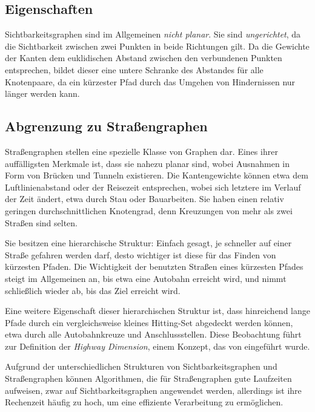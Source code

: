 \subsection{Eigenschaften}

Sichtbarkeitsgraphen sind im Allgemeinen \emph{nicht planar}.
Sie sind \emph{ungerichtet}, da die Sichtbarkeit zwischen zwei Punkten in beide Richtungen gilt.
Da die Gewichte der Kanten dem euklidischen Abstand zwischen den verbundenen Punkten entsprechen, bildet dieser eine untere Schranke des Abstandes für alle Knotenpaare, da ein kürzester Pfad durch das Umgehen von Hindernissen nur länger werden kann.

\subsection{Abgrenzung zu Straßengraphen}\label{graphs:strassengraphen}

Straßengraphen stellen eine spezielle Klasse von Graphen dar.
Eines ihrer auffälligsten Merkmale ist, dass sie nahezu planar sind, wobei Ausnahmen in Form von Brücken und Tunneln existieren.
Die Kantengewichte können etwa dem Luftlinienabstand oder der Reisezeit entsprechen, wobei sich letztere im Verlauf der Zeit ändert, etwa durch Stau oder Bauarbeiten.
Sie haben einen relativ geringen durchschnittlichen Knotengrad, denn Kreuzungen von mehr als zwei Straßen sind selten.

Sie besitzen eine hierarchische Struktur: Einfach gesagt, je schneller auf einer Straße gefahren werden darf, desto wichtiger ist diese für das Finden von kürzesten Pfaden.
Die Wichtigkeit der benutzten Straßen eines kürzesten Pfades steigt im Allgemeinen an, bis etwa eine Autobahn erreicht wird, und nimmt schließlich wieder ab, bis das Ziel erreicht wird.

Eine weitere Eigenschaft dieser hierarchischen Struktur ist, dass hinreichend lange Pfade durch ein vergleichsweise kleines Hitting-Set abgedeckt werden können, etwa durch alle Autobahnkreuze und Anschlussstellen.
Diese Beobachtung führt zur Definition der \emph{Highway Dimension}, einem Konzept, das von \cite{abraham2010highway} eingeführt wurde.

Aufgrund der unterschiedlichen Strukturen von Sichtbarkeitsgraphen und Straßengraphen können Algorithmen, die für Straßengraphen gute Laufzeiten aufweisen, zwar auf Sichtbarkeitsgraphen angewendet werden, allerdings ist ihre Rechenzeit häufig zu hoch, um eine effiziente Verarbeitung zu ermöglichen.



